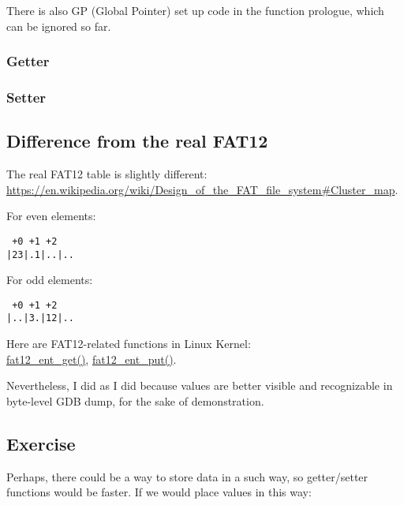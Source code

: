 There is also GP (Global Pointer) set up code in the function prologue, which can be ignored so far.

\subsubsection{Getter}



\subsubsection{Setter}



\subsection{Difference from the real FAT12}

The real FAT12 table is slightly different: \url{https://en.wikipedia.org/wiki/Design_of_the_FAT_file_system\#Cluster_map}.

For even elements:

\begin{lstlisting}
 +0 +1 +2
|23|.1|..|..
\end{lstlisting}

For odd elements:

\begin{lstlisting}
 +0 +1 +2
|..|3.|12|..
\end{lstlisting}

Here are FAT12-related functions in Linux Kernel:\\
\href{https://github.com/torvalds/linux/blob/de182468d1bb726198abaab315820542425270b7/fs/fat/fatent.c#L117}{fat12\_ent\_get()},
\href{https://github.com/torvalds/linux/blob/de182468d1bb726198abaab315820542425270b7/fs/fat/fatent.c#L153}{fat12\_ent\_put()}.

Nevertheless, I did as I did because values are better visible and recognizable in byte-level GDB dump, for the sake of demonstration.

\subsection{Exercise}

Perhaps, there could be a way to store data in a such way, so getter/setter functions would be faster.
If we would place values in this way:

